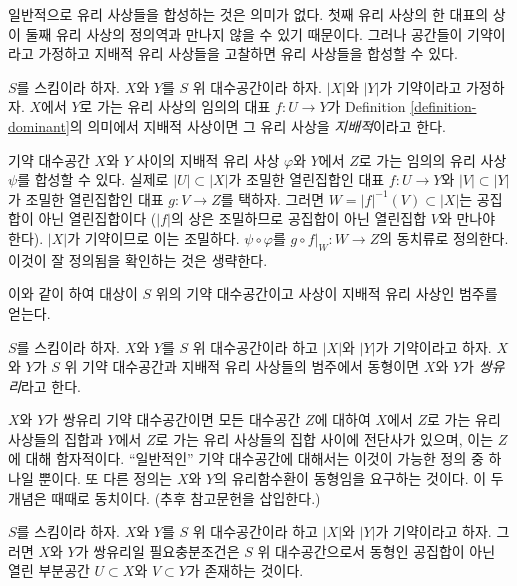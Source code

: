 \noindent
일반적으로 유리 사상들을 합성하는 것은 의미가 없다. 첫째 유리 사상의
한 대표의 상이 둘째 유리 사상의 정의역과 만나지 않을 수 있기 때문이다.
그러나 공간들이 기약이라고 가정하고 지배적 유리 사상들을 고찰하면 유리
사상들을 합성할 수 있다.

\begin{definition}
\label{definition-dominant-rational}
$S$를 스킴이라 하자. $X$와 $Y$를 $S$ 위 대수공간이라 하자.
$|X|$와 $|Y|$가 기약이라고 가정하자. $X$에서 $Y$로 가는 유리 사상의
임의의 대표 $f : U \to Y$가 Definition \ref{definition-dominant}의
의미에서 지배적 사상이면 그 유리 사상을 {\it 지배적}이라고 한다.
\end{definition}

\noindent
기약 대수공간 $X$와 $Y$ 사이의 지배적 유리 사상 $\varphi$와 $Y$에서
$Z$로 가는 임의의 유리 사상 $\psi$를 합성할 수 있다. 실제로
$|U| \subset |X|$가 조밀한 열린집합인 대표 $f : U \to Y$와
$|V| \subset |Y|$가 조밀한 열린집합인 대표 $g : V \to Z$를 택하자.
그러면 $W = |f|^{-1}(V) \subset |X|$는 공집합이 아닌 열린집합이다
($|f|$의 상은 조밀하므로 공집합이 아닌 열린집합 $V$와 만나야 한다).
$|X|$가 기약이므로 이는 조밀하다. $\psi \circ \varphi$를
$g \circ f|_W : W \to Z$의 동치류로 정의한다. 이것이 잘 정의됨을
확인하는 것은 생략한다.

\medskip\noindent
이와 같이 하여 대상이 $S$ 위의 기약 대수공간이고 사상이 지배적 유리
사상인 범주를 얻는다.

\begin{definition}
\label{definition-birational-spaces}
$S$를 스킴이라 하자. $X$와 $Y$를 $S$ 위 대수공간이라 하고
$|X|$와 $|Y|$가 기약이라고 하자. $X$와 $Y$가 $S$ 위 기약 대수공간과
지배적 유리 사상들의 범주에서 동형이면 $X$와 $Y$가 {\it 쌍유리}라고
한다.
\end{definition}

\noindent
$X$와 $Y$가 쌍유리 기약 대수공간이면 모든 대수공간 $Z$에 대하여
$X$에서 $Z$로 가는 유리 사상들의 집합과
$Y$에서 $Z$로 가는 유리 사상들의 집합 사이에 전단사가 있으며, 이는
$Z$에 대해 함자적이다. “일반적인” 기약 대수공간에 대해서는 이것이
가능한 정의 중 하나일 뿐이다. 또 다른 정의는 $X$와 $Y$의 유리함수환이
동형임을 요구하는 것이다. 이 두 개념은 때때로 동치이다.
(추후 참고문헌을 삽입한다.)

\begin{lemma}
\label{lemma-birational}
$S$를 스킴이라 하자.
$X$와 $Y$를 $S$ 위 대수공간이라 하고 $|X|$와 $|Y|$가 기약이라고
하자. 그러면 $X$와 $Y$가 쌍유리일 필요충분조건은 $S$ 위 대수공간으로서
동형인 공집합이 아닌 열린 부분공간 $U \subset X$와 $V \subset Y$가
존재하는 것이다.
\end{lemma}

